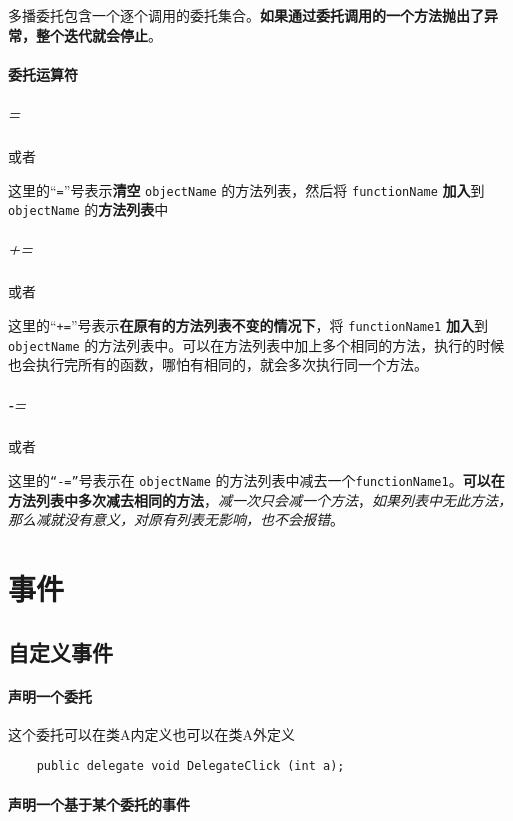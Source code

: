 \documentclass[UTF8,a4paper,12pt]{ctexbook}
\begin{document}
		 	多播委托包含一个逐个调用的委托集合。\textbf{如果通过委托调用的一个方法抛出了异常，整个迭代就会停止}。
		 
		 \paragraph{委托运算符} 
		 	\subparagraph{=}	 
		 		或者 
		 		
		 		这里的“\verb|=|”号表示\textbf{清空} \verb|objectName| 的方法列表，然后将 \verb|functionName| \textbf{加入}到 \verb|objectName| 的\textbf{方法列表}中	 	
		 	
		 	\subparagraph{+=} 	 
		 		或者 
		 			 		
		 		这里的“\verb|+=|”号表示\textbf{在原有的方法列表不变的情况下}，将 \verb|functionName1|  \textbf{加入}到 \verb|objectName| 的方法列表中。可以在方法列表中加上多个相同的方法，执行的时候也会执行完所有的函数，哪怕有相同的，就会多次执行同一个方法。
		 		
		 	\subparagraph{-=}	 
		 		或者 
		 		
		 		这里的\verb|“-=”|号表示在 \verb|objectName| 的方法列表中减去一个\verb|functionName1|。\textbf{可以在方法列表中多次减去相同的方法}，\textit{减一次只会减一个方法}，\textit{如果列表中无此方法，那么减就没有意义，对原有列表无影响，也不会报错}。
		 		
	\section{事件}
		\subsection{自定义事件}
			\paragraph{声明一个委托}
			
				这个委托可以在类A内定义也可以在类A外定义
			
				\begin{lstlisting}
	public delegate void DelegateClick (int a);
				\end{lstlisting}
			\paragraph{声明一个基于某个委托的事件}
				
\end{document}
